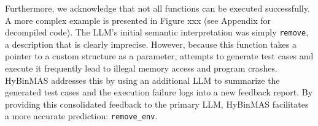 \documentclass[acmsmall,screen,review,anonymous]{acmart} %
\begin{document}
Furthermore, we acknowledge that not all functions can be executed successfully. A more complex example is presented in Figure xxx (see Appendix for decompiled code). The LLM's initial semantic interpretation was simply \lstinline{remove}, a description that is clearly imprecise. However, because this function takes a pointer to a custom structure as a parameter, attempts to generate test cases and execute it frequently lead to illegal memory access and program crashes. HyBinMAS addresses this by using an additional LLM to summarize the generated test cases and the execution failure logs into a new feedback report. By providing this consolidated feedback to the primary LLM, HyBinMAS facilitates a more accurate prediction: \lstinline{remove_env}.




\end{document}
